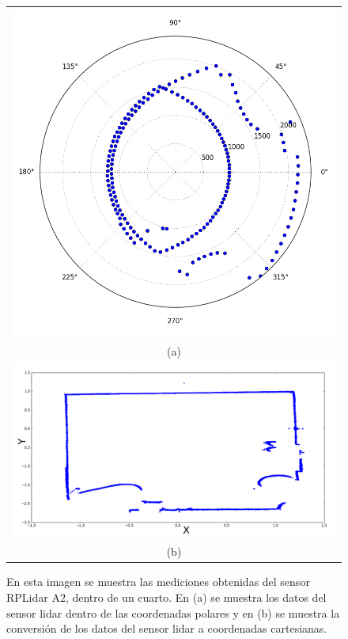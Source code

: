\begin{figure}%
	\centering
	\begin{tabular}{c}
		\multicolumn{1}{c}{\includegraphics[width=.7\textwidth]{images/lidarpolar.png}}\\
      	\multicolumn{1}{c}{(a)}\\
      	\multicolumn{1}{c}{\includegraphics[width=.75\textwidth]{images/lidarXY.png}}\\
      	\multicolumn{1}{c}{(b)}
	\end{tabular}
	\captionsetup{font=footnotesize}
    \caption{\label{f:lidarPlot}En esta imagen se muestra las mediciones obtenidas del sensor 
    RPLidar A2, dentro de un cuarto. En (a) se muestra los datos del sensor lidar dentro de las 
    coordenadas polares y en (b) se muestra la conversión de los datos del sensor lidar a 
    coordenadas cartesianas.}
\end{figure}

